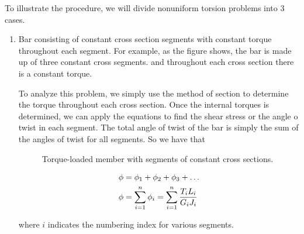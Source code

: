 \documentclass[
10pt,
a4paper,
openany,
svgnames,
]{book}
\begin{document}
To illustrate the procedure, we will divide nonuniform torsion problems into 3 cases.
\begin{enumerate}
\item Bar consisting of constant cross section segments with constant torque throughout each segment. For example, as the figure shows, the bar is made up of three constant cross segments. and throughout each cross section there is a constant torque.
  
  To analyze this problem, we simply use the method of section to determine the torque throughout each cross section. Once the internal torques is determined, we can apply the equations to find the shear stress or the angle o twist in each segment. The total angle of twist of the bar is simply the sum of the angles of twist for all segments. So we have that

    \begin{figure}[h]
    \centering
    \caption{Torque-loaded member with segments of constant cross sections.}
  \end{figure}
  
  \begin{equation}
    \begin{gathered}
      \phi  = \phi_1 + \phi_2 + \phi_3 +  \ldots  \hfill \\
      \phi  = \sum\limits_{i = 1}^n \phi_i = \sum\limits_{i = 1}^n \dfrac{T_iL_i}{G_iJ_i}  \hfill \\ 
    \end{gathered}
  \end{equation}
  
  where $i$ indicates the numbering index for various segments.
  

\end{enumerate}
\end{document}
